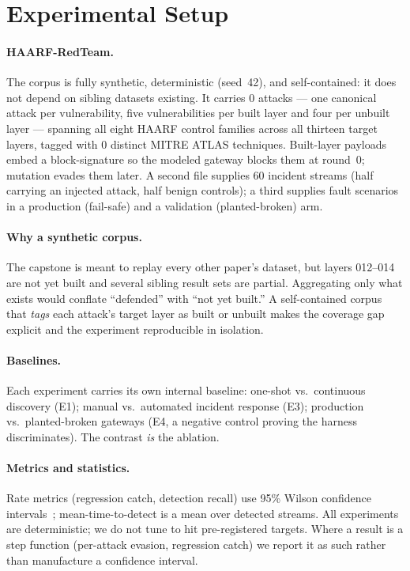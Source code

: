 \documentclass[11pt]{article}
\providecommand{\EoneNAttacks}{0}
\providecommand{\EfiveAtlas}{0}
\begin{document}
\section{Experimental Setup}
\paragraph{HAARF-RedTeam.}\label{sec:benchmark} The corpus is fully synthetic,
deterministic (seed~42), and self-contained: it does not depend on sibling datasets
existing. It carries \EoneNAttacks{} attacks --- one canonical attack per
vulnerability, five vulnerabilities per built layer and four per unbuilt layer ---
spanning all eight HAARF control families across all thirteen target layers, tagged
with \EfiveAtlas{} distinct MITRE ATLAS techniques. Built-layer payloads embed a
block-signature so the modeled gateway blocks them at round~0; mutation evades them
later. A second file supplies 60 incident streams (half carrying an injected attack,
half benign controls); a third supplies fault scenarios in a production (fail-safe)
and a validation (planted-broken) arm.

\paragraph{Why a synthetic corpus.} The capstone is meant to replay every other
paper's dataset, but layers 012--014 are not yet built and several sibling result
sets are partial. Aggregating only what exists would conflate ``defended'' with
``not yet built.'' A self-contained corpus that \emph{tags} each attack's target
layer as built or unbuilt makes the coverage gap explicit and the experiment
reproducible in isolation.

\paragraph{Baselines.} Each experiment carries its own internal baseline: one-shot
vs.\ continuous discovery (E1); manual vs.\ automated incident response (E3);
production vs.\ planted-broken gateways (E4, a negative control proving the harness
discriminates). The contrast \emph{is} the ablation.

\paragraph{Metrics and statistics.} Rate metrics (regression catch, detection
recall) use 95\% Wilson confidence intervals~\cite{wilson1927}; mean-time-to-detect
is a mean over detected streams. All experiments are deterministic; we do not tune to
hit pre-registered targets. Where a result is a step function (per-attack evasion,
regression catch) we report it as such rather than manufacture a confidence interval.
\end{document}

